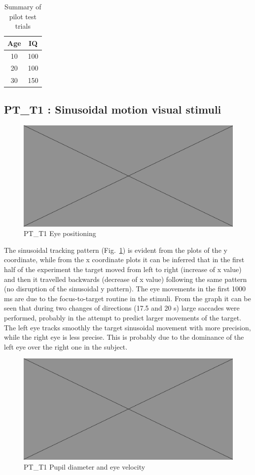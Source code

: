\begin{table}[h]
  \centering
  \begin{tabular}{c|c}
    Age  & IQ  \\ 
    \hline
    10   & 100 \\
    20   & 100 \\
    30   & 150
  \end{tabular}
  \caption{Summary of pilot test trials}
  \label{tab:pilotsummary}
\end{table}


\subsection{PT\_T1 : Sinusoidal motion visual stimuli}
\label{sec:PT_T1}

\begin{figure}[h]
  \centering
  \includegraphics[width=.5\textwidth]{figures/placeholderImg.jpg}
  \caption[PT\_T1 Eye positioning]{PT\_T1 Eye positioning}
  \label{fig:PT_T1_pos}
\end{figure}

The sinusoidal tracking pattern (Fig.~\ref{fig:PT_T1_pos}) is evident from the plots of the y coordinate, while from the x coordinate plots it can be inferred that in the first half of the experiment the target moved from left to right (increase of x value) and then it travelled backwards (decrease of x value) following the same pattern (no disruption of the sinusoidal y pattern). The eye movements in the first 1000 ms are due to the focus-to-target routine in the stimuli. From the graph it can be seen that during two changes of directions (17.5 and 20 s) large saccades were performed, probably in the attempt to predict larger movements of the target. The left eye tracks smoothly the target sinusoidal movement with more precision, while the right eye is less precise. This is probably due to the dominance of the left eye over the right one in the subject.

\begin{figure}[h]
  \centering
  \includegraphics[width=.5\textwidth]{figures/placeholderImg.jpg}
  \caption[PT\_T1 pupil velocity]{PT\_T1 Pupil diameter and eye velocity}
  \label{fig:PT_T1_vel}
\end{figure}

